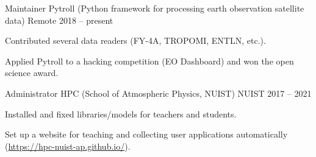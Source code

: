 

\begin{cventries}

  \cventry
    {Maintainer} %
    {Pytroll (Python framework for processing earth observation satellite data)} %
    {Remote} %
    {2018 -- present} %
    {
      \begin{cvitems} %
        \item {Contributed several data readers (FY-4A, TROPOMI, ENTLN, etc.).}
        \item {Applied Pytroll to a hacking competition (EO Dashboard) and won the open science award.}
      \end{cvitems}
    }

  \cventry
    {Administrator} %
    {HPC (School of Atmospheric Physics, NUIST)} %
    {NUIST} %
    {2017 -- 2021} %
    {
      \begin{cvitems} %
        \item {Installed and fixed libraries/models for teachers and students.}
        \item {Set up a website for teaching and collecting user applications automatically (\url{https://hpc-nuist-ap.github.io/}).}
      \end{cvitems}
    }

\end{cventries}
